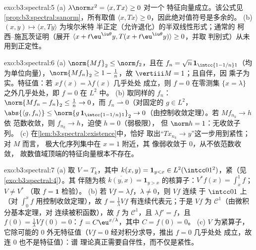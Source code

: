 \begin{solution}{exo:b3:spectral:5}
(a) $\lambda\norm x^2 = \langle x, Tx\rangle \geq 0$ 对一个
特征向量成立。该公式见
\cref{prop:b3:spectral:sanorm}，所有取值 $\langle x,
Tx\rangle \geq 0$，因此绝对值符号是多余的。
(b) $(x, y) \mapsto \langle x, Ty\rangle$ 为埃尔米特
半正定（允许退化）的半双线性形式；通常的
柯西–施瓦茨证明（展开 $\langle x + t\eu^{\iu\theta}y,
T(x + t\eu^{\iu\theta}y)\rangle \geq 0$，并取
判别式）从未用到正定性。
\end{solution}

\begin{solution}{exo:b3:spectral:6}
(a) $\norm{Mf}_2 \leq \norm f_2$，且在 $f_n = \sqrt n\,
\mathbf 1_{\intcc{1 - 1/n}1}$（均为单位向量），$\norm{Mf_n}_2
\geq 1 - \frac1n$，故 $\vertiii M = 1$；且自伴，因
乘子为实。特征值：若 $xf(x) = \lambda f(x)$ 几乎处处
成立，则 $f = 0$ 在零测集 $\{x = \lambda\}$ 之外几乎处处，即 $f =
0$ 在 $L^2$ 中。
(b) 取同样的 $f_n$：$\norm{Mf_n - f_n}_2 \leq \frac1n \to
0$，而 $f_n \rightharpoonup 0$（对固定的 $g \in L^2$，
$\abs{\langle g, f_n\rangle} \leq \norm{g\,\mathbf
1_{\intcc{1-1/n}1}}_2 \to 0$（由控制收敛定理）。若 $Mf_{n_k} \to h$ 依
范数收敛，则 $f_{n_k} \to h$，迫使 $h = 0$（弱极限），
但 $\norm h = 1$：无收敛子列。
(c) 在\cref{lem:b3:spectral:existence}中，恰好
取出“$Tx_{n_k} \to y$”这一步用到紧性；对 $M$ 而言，
极大化序列集中在 $x = 1$ 附近，其
像弱收敛于 $0$，从不依范数收敛，
故数值域顶端的特征向量根本不存在。
\end{solution}

\begin{solution}{exo:b3:spectral:7}
(a) 取 $V = T_k$，其中 $k(x, y) = \mathbf 1_{y < x} \in
L^2(\intcc01^2)$，紧（见\cref{exo:b3:spectral:4}）。其
伴随为核 $\overline{k(y,
x)} = \mathbf 1_{y > x}$ 的核算子：$V^*f(x) = \int_x^1f$；$V \neq V^*$
（取 $f = \mathbf 1$ 检验）。
(b) 若 $Vf = \lambda f$，$\lambda \ne 0$，则 $Vf$ 连续
于 $\intcc01$ 上（对 $\int_0^x f$ 用控制收敛定理），故 $f
= \frac1\lambda Vf$ 有连续代表元；于是
$Vf$ 为 $\mathcal C^1$（由微积分基本定理，对
连续被积函数），故 $f$ 为 $\mathcal C^1$，且
$\lambda f' = f$，且 $f(0) = \frac1\lambda Vf(0) = 0$：$f =
C\eu^{x/\lambda}$，其中 $C = f(0) = 0$。
(c) $V$ 为紧算子，它除可能的
$0$ 外无特征值（$Vf = 0$ 经对积分求导，推出 $f = 0$ 几乎处处
成立，故连 $0$ 也不是特征值）：谱
理论真正需要自伴性，而不仅是紧性。
\end{solution}

